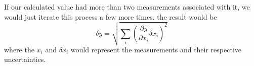 If our calculated value had more than two measurements associated with it, 
we would just iterate this process a few more times. the result would be
\begin{equation}
    \delta y=\sqrt{\sum_i \left(\frac{\partial y}{\partial x_i}\delta x_i\right)^2}
\end{equation}
where the $x_i$ and $\delta x_i$ would represent the measurements and their
respective uncertainties.






